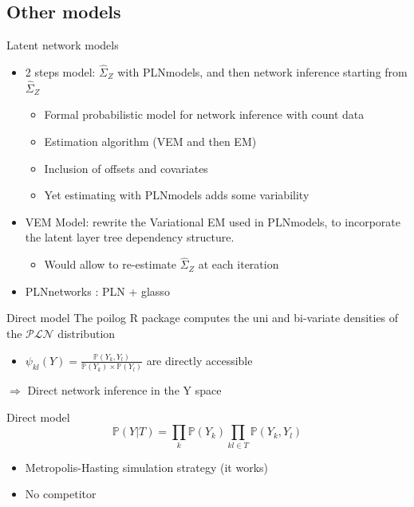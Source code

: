\documentclass[9pt]{beamer}
\newcommand{\emphase}[1]{\textcolor{Complement}{#1}}
\begin{document}
\subsection{Other models}
\begin{frame}{Latent network models}
\large{
    \begin{itemize}
        \item 2 steps model: $\hat{\Sigma}_Z$ with {\selectfont
PLNmodels}, and then network inference starting from $\hat{\Sigma}_Z$
\begin{itemize}
	\item Formal probabilistic model for network inference with \emphase{count data}
	\item  Estimation algorithm (VEM and then EM)
	\item Inclusion of \emphase{offsets} and \emphase{covariates}
    \item Yet estimating with
{\selectfont
PLNmodels} adds some variability \bigskip
        \end{itemize}
        \item VEM Model: rewrite the Variational EM used in {\selectfont
PLNmodels}, to incorporate the latent layer tree dependency structure.
         \begin{itemize}
             \item Would allow to re-estimate  $\hat{\Sigma}_Z$ at each iteration\bigskip
         \end{itemize}
         
         \item PLNnetworks : PLN + glasso
    \end{itemize}}
\end{frame}

\begin{frame}{Direct model}
   The {\selectfont
poilog} R package computes the uni and bi-variate densities of the $\mathcal{PLN}$ distribution \vspace{0.5cm}
    \begin{itemize}
        \item \large{$\psi_{kl}(Y) = \frac{\mathds{P}(Y_k,Y_l)}{\mathds{P}(Y_k)\times \mathds{P}(Y_l)} $} \normalsize are \emphase{directly accessible}
    \end{itemize}


\begin{center}
    $\Rightarrow$ Direct network inference in the Y space\\
\end{center}
\begin{block}{Direct model}
\[\mathds{P}(Y|T) = \prod_k \mathds{P}(Y_k) \prod_{kl \in T} \mathds{P}(Y_k,Y_l)\]

\end{block}
\begin{itemize}
    \item Metropolis-Hasting simulation strategy (it works)
    \item No competitor
\end{itemize}
\end{frame}
\end{document}
